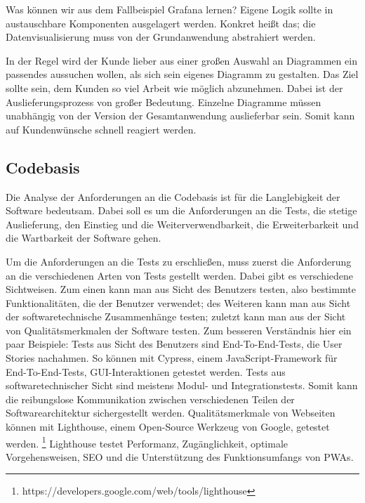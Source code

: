 Was können wir aus dem Fallbeispiel Grafana lernen? Eigene Logik sollte in austauschbare Komponenten
ausgelagert werden. Konkret heißt das; die Datenvisualisierung muss von der Grundanwendung abstrahiert
werden.

In der Regel wird der Kunde lieber aus einer großen Auswahl an Diagrammen ein passendes aussuchen wollen,
als sich sein eigenes Diagramm zu gestalten. Das Ziel sollte sein, dem Kunden so viel Arbeit wie möglich abzunehmen.
Dabei ist der Auslieferungsprozess von großer Bedeutung. Einzelne Diagramme müssen unabhängig von der Version der
Gesamtanwendung auslieferbar sein. Somit kann auf Kundenwünsche schnell reagiert werden.

\subsection{Codebasis}
\label{subsec:codebasis}
Die Analyse der Anforderungen an die Codebasis ist für die Langlebigkeit der Software bedeutsam.
Dabei soll es um die Anforderungen an die Tests, die stetige Auslieferung,
den Einstieg und die Weiterverwendbarkeit, die Erweiterbarkeit und die Wartbarkeit der Software gehen. 

Um die Anforderungen an die Tests zu erschließen, muss zuerst die Anforderung an die verschiedenen
Arten von Tests gestellt werden. Dabei gibt es verschiedene Sichtweisen. Zum einen kann man aus
Sicht des Benutzers testen, also bestimmte Funktionalitäten, die der Benutzer verwendet; des Weiteren
kann man aus Sicht der softwaretechnische Zusammenhänge testen; zuletzt kann man aus der Sicht von
Qualitätsmerkmalen der Software testen.\cite{WikiSoftwaretest} Zum besseren Verständnis hier ein
paar Beispiele: Tests aus Sicht des Benutzers sind End-To-End-Tests, die User Stories nachahmen.
So können mit Cypress, einem JavaScript-Framework für End-To-End-Tests, GUI-Interaktionen getestet werden.
Tests aus softwaretechnischer Sicht sind meistens Modul- und Integrationstests. Somit kann die reibungslose
Kommunikation zwischen verschiedenen Teilen der Softwarearchitektur sichergestellt werden. Qualitätsmerkmale
von Webseiten können mit Lighthouse, einem Open-Source Werkzeug von Google, getestet werden. \footnote{https://developers.google.com/web/tools/lighthouse}
Lighthouse testet Performanz, Zugänglichkeit, optimale Vorgehensweisen, SEO und die Unterstützung
des Funktionsumfangs von PWAs.


